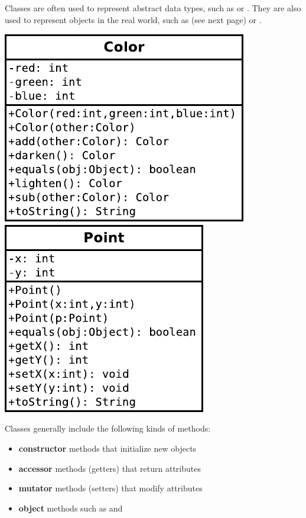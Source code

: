 

Classes are often used to represent abstract data types, such as  or .
They are also used to represent objects in the real world, such as  (see next page) or .

\begin{center}
\includegraphics{Color.pdf}
~~~~~
\includegraphics{Point.pdf}
\end{center}

Classes generally include the following kinds of methods:
\begin{itemize}[itemsep=0pt]
\item \textbf{constructor} methods that initialize new objects
\item \textbf{accessor} methods (getters) that return attributes
\item \textbf{mutator} methods (setters) that modify attributes
\item \textbf{object} methods such as  and 
\end{itemize}


